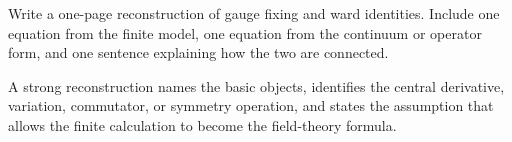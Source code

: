 \begin{exercise}
Write a one-page reconstruction of gauge fixing and ward identities.  Include one equation from the finite model, one equation from the continuum or operator form, and one sentence explaining how the two are connected.
\begin{answer}
A strong reconstruction names the basic objects, identifies the central derivative, variation, commutator, or symmetry operation, and states the assumption that allows the finite calculation to become the field-theory formula.
\end{answer}
\end{exercise}
